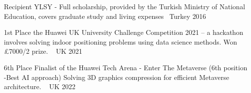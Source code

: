 


\begin{cvhonors}
  \cvhonor
    {Recipient} %
    {YLSY - Full scholarship, provided by the Turkish Ministry of National Education, covers graduate study and living expenses~\href{https://prezi.com/mgf39brhrswv/ylsy-turkish-goverment-funded-scholarship-program/}{\faExternalLink}} %
    {Turkey} %
    {2016} %

  \cvhonor
    {1st Place} %
    {the Huawei UK University Challenge Competition 2021 -- a hackathon involves solving indoor positioning problems using data science methods. Won £7000/2 prize. \href{https://github.com/kahramankostas/Huawei-UK-University-Challenge-Competition-2021}{\faGithub}~\href{https://twitter.com/HuaweiUK/status/1486712513404104709}{\faTwitter}} %
    {UK} %
    {2021} %



  \cvhonor
    {6th Place} %
    {Finalist of the Huawei Tech Arena - Enter The Metaverse (6th position -Best AI approach)
Solving 3D graphics compression for efficient Metaverse architecture. \href{https://github.com/UKTechArena/}{\faGithub}~\href{https://www.linkedin.com/posts/bemyapp_techarenauk2022-activity-7003014375015882752-0GbR}{\faExternalLink}}  %
    {UK} %
    {2022} %










\end{cvhonors}